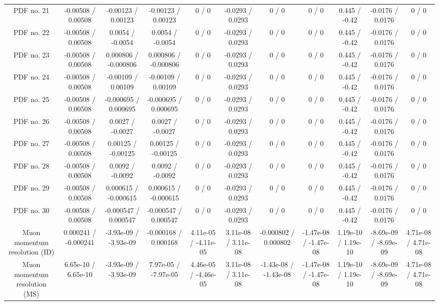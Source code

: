 \begin{table}[htbp]
\begin{center}
\begin{tabular}{|c|c|c|c|c|c|c|c|c|c|c|}
  PDF no. 21 & -0.00508 / 0.00508 & -0.00123 / 0.00123 & -0.00123 / 0.00123 & 0 / 0 & -0.0293 / 0.0293 & 0 / 0 & 0 / 0 & 0.445 / -0.42 & -0.0176 / 0.0176 & 0 / 0 \\ 
  PDF no. 22 & -0.00508 / 0.00508 & 0.0054 / -0.0054 & 0.0054 / -0.0054 & 0 / 0 & -0.0293 / 0.0293 & 0 / 0 & 0 / 0 & 0.445 / -0.42 & -0.0176 / 0.0176 & 0 / 0 \\ 
  PDF no. 23 & -0.00508 / 0.00508 & 0.000806 / -0.000806 & 0.000806 / -0.000806 & 0 / 0 & -0.0293 / 0.0293 & 0 / 0 & 0 / 0 & 0.445 / -0.42 & -0.0176 / 0.0176 & 0 / 0 \\ 
  PDF no. 24 & -0.00508 / 0.00508 & -0.00109 / 0.00109 & -0.00109 / 0.00109 & 0 / 0 & -0.0293 / 0.0293 & 0 / 0 & 0 / 0 & 0.445 / -0.42 & -0.0176 / 0.0176 & 0 / 0 \\ 
  PDF no. 25 & -0.00508 / 0.00508 & -0.000695 / 0.000695 & -0.000695 / 0.000695 & 0 / 0 & -0.0293 / 0.0293 & 0 / 0 & 0 / 0 & 0.445 / -0.42 & -0.0176 / 0.0176 & 0 / 0 \\ 
  PDF no. 26 & -0.00508 / 0.00508 & 0.0027 / -0.0027 & 0.0027 / -0.0027 & 0 / 0 & -0.0293 / 0.0293 & 0 / 0 & 0 / 0 & 0.445 / -0.42 & -0.0176 / 0.0176 & 0 / 0 \\ 
  PDF no. 27 & -0.00508 / 0.00508 & 0.00125 / -0.00125 & 0.00125 / -0.00125 & 0 / 0 & -0.0293 / 0.0293 & 0 / 0 & 0 / 0 & 0.445 / -0.42 & -0.0176 / 0.0176 & 0 / 0 \\ 
  PDF no. 28 & -0.00508 / 0.00508 & 0.0092 / -0.0092 & 0.0092 / -0.0092 & 0 / 0 & -0.0293 / 0.0293 & 0 / 0 & 0 / 0 & 0.445 / -0.42 & -0.0176 / 0.0176 & 0 / 0 \\ 
  PDF no. 29 & -0.00508 / 0.00508 & 0.000615 / -0.000615 & 0.000615 / -0.000615 & 0 / 0 & -0.0293 / 0.0293 & 0 / 0 & 0 / 0 & 0.445 / -0.42 & -0.0176 / 0.0176 & 0 / 0 \\ 
  PDF no. 30 & -0.00508 / 0.00508 & -0.000547 / 0.000547 & -0.000547 / 0.000547 & 0 / 0 & -0.0293 / 0.0293 & 0 / 0 & 0 / 0 & 0.445 / -0.42 & -0.0176 / 0.0176 & 0 / 0 \\ 
  Muon momentum resolution (ID) & 0.000241 / -0.000241 & -3.93e-09 / -3.93e-09 & -0.000168 / 0.000168 & 4.11e-05 / -4.11e-05 & 3.11e-08 / 3.11e-08 & -0.000802 / 0.000802 & -1.47e-08 / -1.47e-08 & 1.19e-10 / 1.19e-10 & -8.69e-09 / -8.69e-09 & 4.71e-08 / 4.71e-08 \\ 
  Muon momentum resolution (MS) & 6.65e-10 / 6.65e-10 & -3.93e-09 / -3.93e-09 & 7.97e-05 / -7.97e-05 & 4.46e-05 / -4.46e-05 & 3.11e-08 / 3.11e-08 & -1.43e-08 / -1.43e-08 & -1.47e-08 / -1.47e-08 & 1.19e-10 / 1.19e-10 & -8.69e-09 / -8.69e-09 & 4.71e-08 / 4.71e-08 \\ 

\end{tabular}
\end{center}
\end{table}
